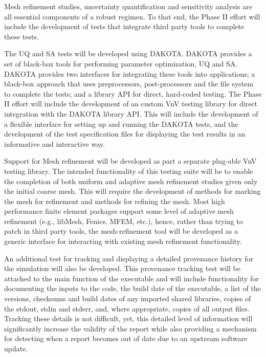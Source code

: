 Mesh refinement studies, uncertainty quantification and sensitivity analysis are all essential components of a robust \VV regimen. To that
end, the Phase II effort will include the development of \VV tests that integrate third party tools to complete these tests. 

The UQ and SA tests will be developed using DAKOTA. DAKOTA provides a set of black-box tools for performing parameter optimization, UQ 
and SA. DAKOTA provides two interfaces for integrating these tools into applications; a black-box approach that uses preprocessors, post-processors
and the file system to complete the tests; and a library API for direct, hard-coded testing. The Phase II 
effort will include the development of an custom VnV testing library for direct integration with the DAKOTA library API. This will include the development
of a flexible interface for setting up and running the DAKOTA tests, and the development of the test specification files for displaying the test results 
in an informative and interactive way. 

Support for Mesh refinement will be developed as part a separate plug-able VnV testing library. The intended functionality of this testing 
suite will be to enable the completion of both uniform and adaptive mesh refinement studies given only the initial coarse mesh. This will require 
the development of methods for marking the mesh for refinement and methods for refining the mesh. Most high performance finite element packages support
some level of adaptive mesh refinement (e.g., libMesh, Fenics, MFEM, etc.), hence, rather than trying to patch in third party tools, the mesh-refinement tool 
will be developed as a generic interface for interacting with existing mesh refinement functionality. 

An additional test for tracking and displaying a detailed provenance history for the simulation will also be developed. This provenance tracking
test will be attached to the main function of the executable and will include functionality for documenting the inputs to the code, the build 
date of the executable, a list of the versions, checksums and build dates of any imported shared libraries, copies of the stdout, stdin and stderr, and, where 
appropriate, copies of all output files. Tracking these details is not difficult, yet, this detailed level of information will significantly increase the validity of the \VV report while also providing a mechanism for detecting when a \VV report becomes out of date due to an upstream software update. 

